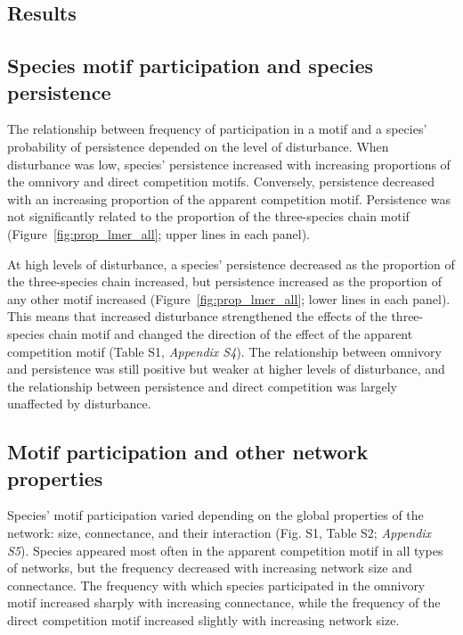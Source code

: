 \documentclass[12pt]{article}
\begin{document}
\begin{spacing}{2.0}
\section*{Results}

    \subsection*{Species motif participation and species persistence} 
    
       The relationship between frequency of participation in a motif and a species' probability of persistence depended on the level of disturbance. 
       When disturbance was low, species' persistence increased with increasing proportions of the omnivory and direct competition motifs. 
       Conversely, persistence decreased with an increasing proportion of the apparent competition motif. 
       Persistence was not significantly related to the proportion of the three-species chain motif (Figure~\ref{fig:prop_lmer_all}; upper lines in each panel).
            
            
        At high levels of disturbance, a species' persistence decreased as the proportion of the three-species chain increased, but persistence increased as the proportion of any other motif increased (Figure~\ref{fig:prop_lmer_all}; lower lines in each panel). 
        This means that increased disturbance strengthened the effects of the three-species chain motif and changed the direction of the effect of the apparent competition motif  (Table S1, \emph{Appendix S4}).
        The relationship between omnivory and persistence was still positive but weaker at higher levels of disturbance, and the relationship between persistence and direct competition was largely unaffected by disturbance.

    \subsection*{Motif participation and other network properties}

       Species' motif participation varied depending on the global properties of the network: size, connectance, and their interaction (Fig. S1, Table S2; \emph{Appendix S5}).
       Species appeared most often in the apparent competition motif in all types of networks, but the frequency decreased with increasing network size and connectance.
       The frequency with which species participated in the omnivory motif increased sharply with increasing connectance, while the frequency of the direct competition motif increased slightly with increasing network size. 
        

\end{spacing}
\end{document}

